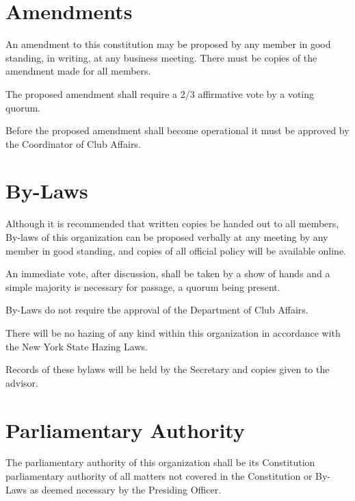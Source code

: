 \section{Amendments}
\begin{subroutines}
\item An amendment to this constitution may be proposed by any member in good standing, in writing, at any business meeting. There must be copies of the amendment made for all members.
\item The proposed amendment shall require a 2/3 affirmative vote by a voting quorum.
\item Before the proposed amendment shall become operational it must be approved by the Coordinator of Club Affairs.
\end{subroutines}

\section{By-Laws}
\begin{subroutines}
\item Although it is recommended that written copies be handed out to all members, By-laws of this organization can be proposed verbally at any meeting by any member in good standing, and copies of all official policy will be available online.
\item An immediate vote, after discussion, shall be taken by a show of hands and a simple majority is necessary for passage, a quorum being present.
\item By-Laws do not require the approval of the Department of Club Affairs.
\item There will be no hazing of any kind within this organization in accordance with the New York State Hazing Laws.
\item Records of these bylaws will be held by the Secretary and copies given to the advisor.
\end{subroutines}

\section{Parliamentary Authority}
\begin{subroutines}
\item The parliamentary authority of this organization shall be its Constitution parliamentary authority of all matters not covered in the Constitution or By-Laws as deemed necessary by the Presiding Officer.
\end{subroutines}



